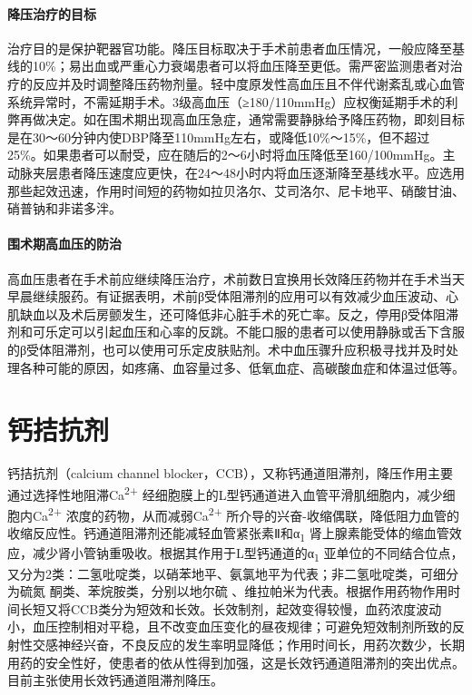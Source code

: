 \paragraph{降压治疗的目标}

治疗目的是保护靶器官功能。降压目标取决于手术前患者血压情况，一般应降至基线的10\%；易出血或严重心力衰竭患者可以将血压降至更低。需严密监测患者对治疗的反应并及时调整降压药物剂量。轻中度原发性高血压且不伴代谢紊乱或心血管系统异常时，不需延期手术。3级高血压（≥180/110mmHg）应权衡延期手术的利弊再做决定。如在围术期出现高血压急症，通常需要静脉给予降压药物，即刻目标是在30～60分钟内使DBP降至110mmHg左右，或降低10\%～15\%，但不超过25\%。如果患者可以耐受，应在随后的2～6小时将血压降低至160/100mmHg。主动脉夹层患者降压速度应更快，在24～48小时内将血压逐渐降至基线水平。应选用那些起效迅速，作用时间短的药物如拉贝洛尔、艾司洛尔、尼卡地平、硝酸甘油、硝普钠和非诺多泮。

\paragraph{围术期高血压的防治}

高血压患者在手术前应继续降压治疗，术前数日宜换用长效降压药物并在手术当天早晨继续服药。有证据表明，术前β受体阻滞剂的应用可以有效减少血压波动、心肌缺血以及术后房颤发生，还可降低非心脏手术的死亡率。反之，停用β受体阻滞剂和可乐定可以引起血压和心率的反跳。不能口服的患者可以使用静脉或舌下含服的β受体阻滞剂，也可以使用可乐定皮肤贴剂。术中血压骤升应积极寻找并及时处理各种可能的原因，如疼痛、血容量过多、低氧血症、高碳酸血症和体温过低等。

\protect\hypertarget{text00410.html}{}{}

\section{钙拮抗剂}

钙拮抗剂（calcium channel
blocker，CCB），又称钙通道阻滞剂，降压作用主要通过选择性地阻滞Ca\textsuperscript{2+}
经细胞膜上的L型钙通道进入血管平滑肌细胞内，减少细胞内Ca\textsuperscript{2+}
浓度的药物，从而减弱Ca\textsuperscript{2+}
所介导的兴奋-收缩偶联，降低阻力血管的收缩反应性。钙通道阻滞剂还能减轻血管紧张素Ⅱ和α\textsubscript{1}
肾上腺素能受体的缩血管效应，减少肾小管钠重吸收。根据其作用于L型钙通道的α\textsubscript{1}
亚单位的不同结合位点，又分为2类：二氢吡啶类，以硝苯地平、氨氯地平为代表；非二氢吡啶类，可细分为硫氮{}
酮类、苯烷胺类，分别以地尔硫{}
、维拉帕米为代表。根据作用药物作用时间长短又将CCB类分为短效和长效。长效制剂，起效变得较慢，血药浓度波动小，血压控制相对平稳，且不改变血压变化的昼夜规律；可避免短效制剂所致的反射性交感神经兴奋，不良反应的发生率明显降低；作用时间长，用药次数少，长期用药的安全性好，使患者的依从性得到加强，这是长效钙通道阻滞剂的突出优点。目前主张使用长效钙通道阻滞剂降压。

